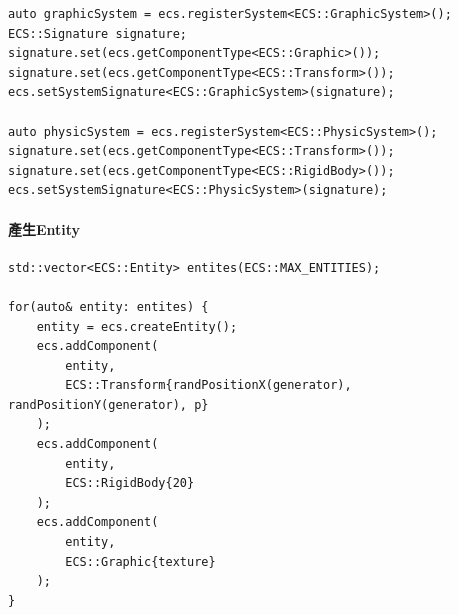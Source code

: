 \begin{lstlisting}
auto graphicSystem = ecs.registerSystem<ECS::GraphicSystem>();
ECS::Signature signature;
signature.set(ecs.getComponentType<ECS::Graphic>());
signature.set(ecs.getComponentType<ECS::Transform>());
ecs.setSystemSignature<ECS::GraphicSystem>(signature);

auto physicSystem = ecs.registerSystem<ECS::PhysicSystem>();
signature.set(ecs.getComponentType<ECS::Transform>());
signature.set(ecs.getComponentType<ECS::RigidBody>());
ecs.setSystemSignature<ECS::PhysicSystem>(signature);
\end{lstlisting}

\paragraph{產生Entity}

\begin{lstlisting}
std::vector<ECS::Entity> entites(ECS::MAX_ENTITIES);

for(auto& entity: entites) {
    entity = ecs.createEntity();
    ecs.addComponent(
        entity,
        ECS::Transform{randPositionX(generator), randPositionY(generator), p}
    );
    ecs.addComponent(
        entity,
        ECS::RigidBody{20}
    );
    ecs.addComponent(
        entity,
        ECS::Graphic{texture}
    );
}
\end{lstlisting}

\newpage